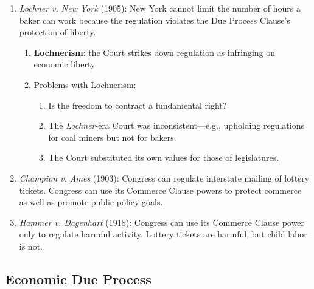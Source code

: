 \begin{enumerate}
    \item \emph{Lochner v. New York} (1905): New York cannot limit the number 
    of hours a baker can work because the regulation violates the Due Process 
    Clause's protection of liberty.
    \begin{enumerate}
        \item \textbf{Lochnerism}: the Court strikes down regulation as 
        infringing on economic liberty.
        \item Problems with Lochnerism:
        \begin{enumerate}
            \item Is the freedom to contract a fundamental right?
            \item The \emph{Lochner}-era Court was inconsistent---e.g., 
            upholding regulations for coal miners but not for bakers.
            \item The Court substituted its own values for those of 
            legislatures.
        \end{enumerate}
    \end{enumerate}
    \item \emph{Champion v. Ames} (1903): Congress can regulate interstate 
    mailing of lottery tickets. Congress can use its Commerce Clause powers to 
    protect commerce as well as promote public policy goals.
    \item \emph{Hammer v. Dagenhart} (1918): Congress can use its Commerce 
    Clause power only to regulate harmful activity. Lottery tickets are 
    harmful, but child labor is not.
\end{enumerate}

\subsection{Economic Due Process}

